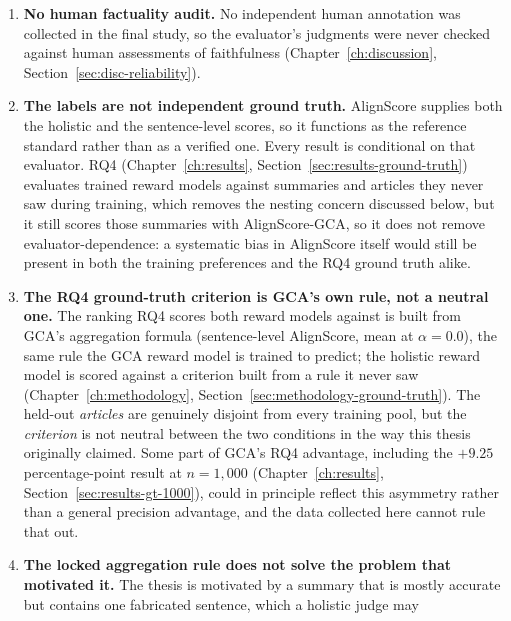 \begin{enumerate}
    re-running the affected campaigns, both for lack of time before
    submission and because doing so is new experimental work beyond what
    had been agreed with the supervisors at this stage of the project.
  \item \textbf{No human factuality audit.} No independent human annotation was
    collected in the final study, so the evaluator's judgments were never checked
    against human assessments of faithfulness
    (Chapter~\ref{ch:discussion}, Section~\ref{sec:disc-reliability}).
  \item \textbf{The labels are not independent ground truth.} AlignScore supplies
    both the holistic and the sentence-level scores, so it functions as the
    reference standard rather than as a verified one. Every result is conditional
    on that evaluator. RQ4 (Chapter~\ref{ch:results},
    Section~\ref{sec:results-ground-truth}) evaluates trained reward models
    against summaries and articles they never saw during training, which
    removes the nesting concern discussed below, but it still scores those
    summaries with AlignScore-GCA, so it does not remove evaluator-dependence:
    a systematic bias in AlignScore itself would still be present in both the
    training preferences and the RQ4 ground truth alike.
  \item \label{lim:gt-criterion-not-neutral}
    \textbf{The RQ4 ground-truth criterion is GCA's own rule, not a
    neutral one.} The ranking RQ4 scores both reward models against is
    built from GCA's aggregation formula (sentence-level AlignScore, mean
    at $\alpha=0.0$), the same rule the GCA reward model is trained to
    predict; the holistic reward model is scored against a criterion built
    from a rule it never saw (Chapter~\ref{ch:methodology},
    Section~\ref{sec:methodology-ground-truth}). The held-out
    \emph{articles} are genuinely disjoint from every training pool, but
    the \emph{criterion} is not neutral between the two conditions in the
    way this thesis originally claimed. Some part of GCA's RQ4 advantage,
    including the $+9.25$ percentage-point result at $n=1{,}000$
    (Chapter~\ref{ch:results}, Section~\ref{sec:results-gt-1000}), could
    in principle reflect this asymmetry rather than a general precision
    advantage, and the data collected here cannot rule that out.
  \item \label{lim:mean-does-not-penalize}
    \textbf{The locked aggregation rule does not solve the problem that
    motivated it.} The thesis is motivated by a summary that is mostly
    accurate but contains one fabricated sentence, which a holistic judge may

\end{enumerate}
